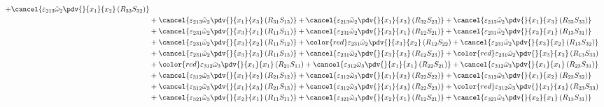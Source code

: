 \begin{equation}
\begin{split}
		+\cancel{\varepsilon_{213}\tilde{\omega}_{2}\pdv{}{x_{1}}{x_{2}}\left(R_{33}S_{32}\right)}\\
&		+\cancel{\varepsilon_{213}\tilde{\omega}_{2}\pdv{}{x_{1}}{x_{3}}\left(R_{31}S_{13}\right)}
		+\cancel{\varepsilon_{213}\tilde{\omega}_{2}\pdv{}{x_{1}}{x_{3}}\left(R_{32}S_{23}\right)}
		+\cancel{\varepsilon_{213}\tilde{\omega}_{2}\pdv{}{x_{1}}{x_{3}}\left(R_{33}S_{33}\right)}\\
&		+\cancel{\varepsilon_{231}\tilde{\omega}_{2}\pdv{}{x_{3}}{x_{1}}\left(R_{11}S_{11}\right)}
		+\cancel{\varepsilon_{231}\tilde{\omega}_{2}\pdv{}{x_{3}}{x_{1}}\left(R_{12}S_{21}\right)}
		+\cancel{\varepsilon_{231}\tilde{\omega}_{2}\pdv{}{x_{3}}{x_{1}}\left(R_{13}S_{31}\right)}\\
&		+\cancel{\varepsilon_{231}\tilde{\omega}_{2}\pdv{}{x_{3}}{x_{2}}\left(R_{11}S_{12}\right)}
		+{\color{red}\varepsilon_{231}\tilde{\omega}_{2}\pdv{}{x_{3}}{x_{2}}\left(R_{12}S_{22}\right)}
		+\cancel{\varepsilon_{231}\tilde{\omega}_{2}\pdv{}{x_{3}}{x_{2}}\left(R_{13}S_{32}\right)}\\
&		+\cancel{\varepsilon_{231}\tilde{\omega}_{2}\pdv{}{x_{3}}{x_{3}}\left(R_{11}S_{13}\right)}
		+\cancel{\varepsilon_{231}\tilde{\omega}_{2}\pdv{}{x_{3}}{x_{3}}\left(R_{12}S_{23}\right)}
		+{\color{red}\varepsilon_{231}\tilde{\omega}_{2}\pdv{}{x_{3}}{x_{3}}\left(R_{13}S_{33}\right)}\\
&		+{\color{red}\varepsilon_{312}\tilde{\omega}_{3}\pdv{}{x_{1}}{x_{1}}\left(R_{21}S_{11}\right)}
		+\cancel{\varepsilon_{312}\tilde{\omega}_{3}\pdv{}{x_{1}}{x_{1}}\left(R_{22}S_{21}\right)}
		+\cancel{\varepsilon_{312}\tilde{\omega}_{3}\pdv{}{x_{1}}{x_{1}}\left(R_{23}S_{31}\right)}\\
&		+\cancel{\varepsilon_{312}\tilde{\omega}_{3}\pdv{}{x_{1}}{x_{2}}\left(R_{21}S_{12}\right)}
		+\cancel{\varepsilon_{312}\tilde{\omega}_{3}\pdv{}{x_{1}}{x_{2}}\left(R_{22}S_{22}\right)}
		+\cancel{\varepsilon_{312}\tilde{\omega}_{3}\pdv{}{x_{1}}{x_{2}}\left(R_{23}S_{32}\right)}\\
&		+\cancel{\varepsilon_{312}\tilde{\omega}_{3}\pdv{}{x_{1}}{x_{3}}\left(R_{21}S_{13}\right)}
		+\cancel{\varepsilon_{312}\tilde{\omega}_{3}\pdv{}{x_{1}}{x_{3}}\left(R_{22}S_{23}\right)}
		+{\color{red}\varepsilon_{312}\tilde{\omega}_{3}\pdv{}{x_{1}}{x_{3}}\left(R_{23}S_{33}\right)}\\
&		+\cancel{\varepsilon_{321}\tilde{\omega}_{3}\pdv{}{x_{2}}{x_{1}}\left(R_{11}S_{11}\right)}
		+\cancel{\varepsilon_{321}\tilde{\omega}_{3}\pdv{}{x_{2}}{x_{1}}\left(R_{12}S_{21}\right)}
		+\cancel{\varepsilon_{321}\tilde{\omega}_{3}\pdv{}{x_{2}}{x_{1}}\left(R_{13}S_{31}\right)}\\

\end{split}
\end{equation}
